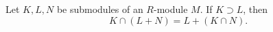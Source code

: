 Let $K, L, N$ be submodules of an $R$-module $M$. If $K \supset L$, then
$$K \cap (L + N) = L + (K \cap N).$$
